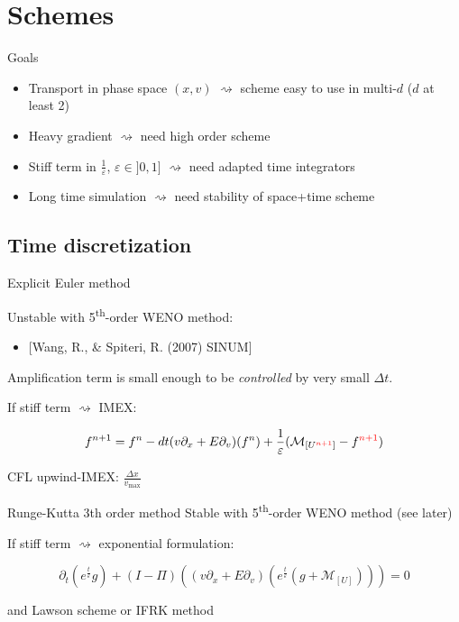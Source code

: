 \documentclass{beamer}
\begin{document}
  \section{Schemes}
	\begin{frame}{Goals}
		\begin{itemize}
      \item Transport in phase space $(x,v)$                               $\rightsquigarrow$ scheme easy to use in multi-$d$ ($d$ at least 2)
      \item Heavy gradient                                                 $\rightsquigarrow$ need high order scheme
      \item Stiff term in $\frac{1}{\varepsilon}$, $\varepsilon \in ]0,1]$ $\rightsquigarrow$ need adapted time integrators
      \item Long time simulation                                           $\rightsquigarrow$ need stability of space+time scheme
		\end{itemize}
	\end{frame}

  \subsection{Time discretization}
  \begin{frame}{Explicit Euler method}

    Unstable with 5\textsuperscript{th}-order WENO method:\begin{itemize}\item {[Wang, R., \& Spiteri, R. (2007) SINUM]}\end{itemize}


    Amplification term is small enough to be \emph{controlled} by {\tiny very} small $\Delta t$.

    If stiff term $\rightsquigarrow$ IMEX:

    $$
      f^{n+1} = f^n -dt(v\partial_x+E\partial_v)(f^n) + \frac{1}{\varepsilon}(\mathcal{M}_{[U^{{\color{red}n+1}}]}-f^{{\color{red}n+1}})
    $$

    CFL upwind-IMEX: $\frac{\Delta x}{v_{\text{max}}}$

  \end{frame}
  \begin{frame}{Runge-Kutta 3th order method}
    Stable with 5\textsuperscript{th}-order WENO method (see later)

    If stiff term $\rightsquigarrow$ exponential formulation:

    $$
      \partial_t(e^{\frac{t}{\varepsilon}}g) + (I-\Pi)\left((v\partial_x+E\partial_v)(e^{\frac{t}{\varepsilon}}(g+\mathcal{M}_{[U]}))\right) = 0
    $$

    and Lawson scheme or IFRK method
  \end{frame}
\end{document}
